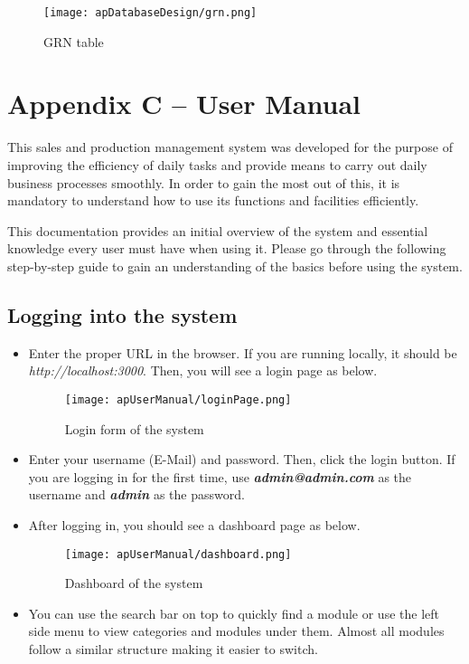 \documentclass[12pt]{report}
\begin{document}
\begin{figure}[H]
	\centering
	\texttt{[image: apDatabaseDesign/grn.png]}
	\caption{GRN table}
\end{figure}

\setcounter{chapter}{3}
\setcounter{section}{0}
\setcounter{figure}{0}
\chapter*{\Huge Appendix C – User Manual}
This sales and production management system was developed for the purpose of improving the efficiency of daily tasks and provide means to carry out daily business processes smoothly. In order to gain the most out of this, it is mandatory to understand how to use its functions and facilities efficiently.

This documentation provides an initial overview of the system and essential knowledge every user must have when using it. Please go through the following step-by-step guide to gain an understanding of the basics before using the system.

\section{Logging into the system}

\begin{itemize}
	\item Enter the proper URL in the browser. If you are running locally, it should be {\it{http://localhost:3000}}. Then, you will see a login page as below.

	      \begin{figure}[H]
		      \centering
		      \texttt{[image: apUserManual/loginPage.png]}
		      \caption{Login form of the system}
	      \end{figure}

	\item Enter your username (E-Mail) and password. Then, click the login button. If you are logging in for the first time, use {\it\bf{admin@admin.com}} as the username and {\it\bf{admin}} as the password.
	\item After logging in, you should see a dashboard page as below.

	      \begin{figure}[H]
		      \centering
		      \texttt{[image: apUserManual/dashboard.png]}
		      \caption{Dashboard of the system}
	      \end{figure}

	\item You can use the search bar on top to quickly find a module or use the left side menu to view categories and modules under them. Almost all modules follow a similar structure making it easier to switch.

\end{itemize}
\end{document}
